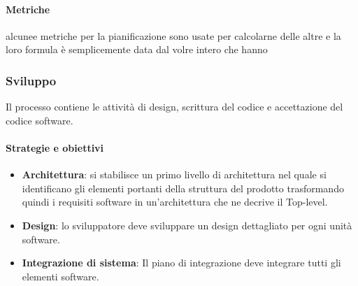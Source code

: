           \paragraph{Metriche}
           alcunee metriche per la pianificazione sono usate per calcolarne delle altre e la loro formula è semplicemente data dal volre intero che hanno
            \def\productquality{
            {   Budget at Completion [BG],
                numero intero, 
                $ \pm 5 \% $ del preventivo,
                pari al preventivo
            },
            {   Earned value [EV],
                BAC - $\%$ di lavoro completato, 
                $ >0$,
                $ >0$
            },
            {   Planned value [PV],
                valore pianificato nel momento del calcolo, 
                $ >0$,
                $ >0$
            },
            {  Acual cost [AC],
               numero intero, 
                0 < AC $\leq$ budget totale,
                0 < AC $\leq$ PV
            },
            {   Schedule variance [SV],
               SV = EV - PV, 
                $ >0$,
                $ 0$
            },
            {    Cost variance [CV],
               CV = EV - AC, 
                $ >0$,
                $ \geq 0$
            },
        }
 


        
    \subsubsection{Sviluppo}
    Il processo contiene le attività di design, scrittura del codice e accettazione del codice software.
    
        \paragraph{Strategie e obiettivi}
        \begin{itemize}
            \item \textbf{Architettura}: si stabilisce un primo livello di architettura nel quale si identificano gli elementi portanti della struttura del prodotto trasformando quindi i requisiti software in un'architettura che ne decrive il Top-level.
            \item \textbf{Design}: lo sviluppatore deve sviluppare un design dettagliato per ogni unità software.
            \item \textbf{Integrazione di sistema}: Il piano di integrazione deve integrare tutti gli elementi software.
        \end{itemize}
        
